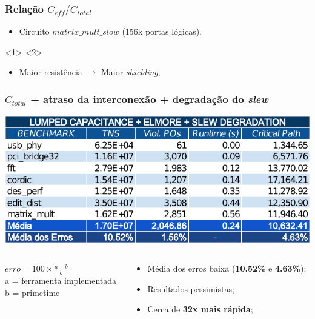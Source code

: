 \documentclass[10pt,a4paper]{beamer}
\begin{document}
		\begin{frame}
			\frametitle{Relação $C_{eff} / C_{total}$}
			\begin{itemize}
				\item Circuito $matrix\_mult\_slow$ (156k portas lógicas).
			\end{itemize}
			\begin{center}
				<1>
				<2>
			\end{center}
			
			{
				\begin{itemize}
					\item Maior resistência $\to$ Maior \textit{shielding};
				\end{itemize}
			}
		\end{frame}

		\begin{frame}[t]
			\frametitle{$C_{total}$ + atraso da interconexão + degradação do \textit{slew}}
			\vspace{-.5cm}
			\begin{center}
				\includegraphics[width=\linewidth]{img/lump_elmore_slew.pdf}
			\end{center}
			\vspace{-.5cm}
			\begin{columns}
				\begin{column}{0.4\textwidth}
					\begin{shaded}
						$erro = 100 \times \frac{a - b}{ b } $ \\
						\small{a = ferramenta implementada} \\
						\small{b = primetime}
					\end{shaded}
				\end{column}
				\begin{column}{0.6\textwidth}
					\begin{itemize}
						\item Média dos erros baixa (\textbf{10.52\%} e \textbf{4.63\%});
						\item Resultados pessimistas;
						\item Cerca de \textbf{32x mais rápida};
					\end{itemize}
				\end{column}
			\end{columns}			
			
		\end{frame}
		
\end{document}
